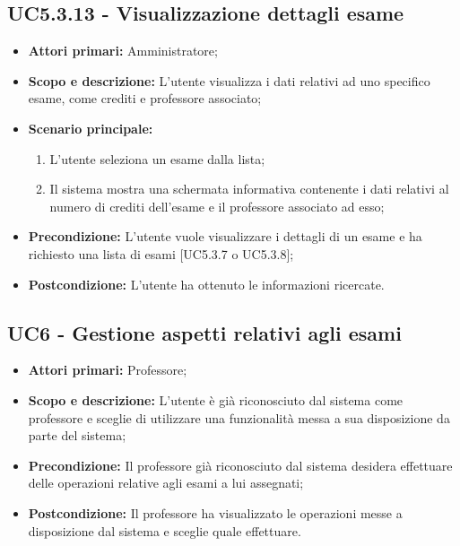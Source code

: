 \documentclass[AnalisiDeiRequisiti.tex]{subfiles}
\begin{document}
\subsection{UC5.3.13 - Visualizzazione dettagli esame}
\begin{itemize}
	\item \textbf{Attori primari:} Amministratore;
	\item \textbf{Scopo e descrizione:} L'utente visualizza i dati relativi ad uno specifico esame, come crediti e professore associato;
	\item \textbf{Scenario principale:}
		\begin{enumerate}
			\item L'utente seleziona un esame dalla lista;
			\item Il sistema mostra una schermata informativa contenente i dati relativi al numero di crediti dell'esame e il professore associato ad esso;
		\end{enumerate}
	\item \textbf{Precondizione:} L'utente vuole visualizzare i dettagli di un esame e ha richiesto una lista di esami [UC5.3.7 o UC5.3.8]; 
	\item \textbf{Postcondizione:} L'utente ha ottenuto le informazioni ricercate.
\end{itemize}

\subsection{UC6 - Gestione aspetti relativi agli esami}
\begin{itemize}
	\item \textbf{Attori primari:} Professore;\\
	\item \textbf{Scopo e descrizione:} L'utente è già riconosciuto dal sistema come professore e sceglie di utilizzare una funzionalità messa a sua disposizione da parte del sistema;\\
	\item \textbf{Precondizione:} Il professore già riconosciuto dal sistema desidera effettuare delle operazioni relative agli esami a lui assegnati;\\
	\item \textbf{Postcondizione:} Il professore ha visualizzato le operazioni messe a disposizione dal sistema e sceglie quale effettuare.\\
\end{itemize}
\end{document}
